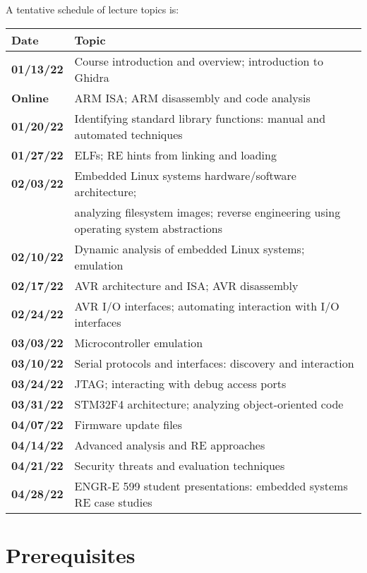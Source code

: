 \documentclass[12pt,twoside]{article}
\renewcommand\_{\textunderscore\allowbreak}
\begin{document}
A tentative schedule of lecture topics is:

\begin{center}
\renewcommand{\arraystretch}{1.5}
\begin{tabular}{|l|l|}
\hline
{\bf Date} & {\bf Topic}\\
\hline
{\bf 01/13/22} & Course introduction and overview; introduction to Ghidra\\
\hline
{\bf Online} & ARM ISA; ARM disassembly and code analysis\\
\hline
{\bf 01/20/22} & Identifying standard library functions: manual and automated techniques\\
\hline
{\bf 01/27/22} & ELFs; RE hints from linking and loading\\
\hline
{\bf 02/03/22} & Embedded Linux systems hardware/software architecture; \\
& analyzing filesystem images; reverse engineering using operating system abstractions\\
\hline
{\bf 02/10/22} & Dynamic analysis of embedded Linux systems; emulation\\
\hline
{\bf 02/17/22} & AVR architecture and ISA; AVR disassembly\\
\hline
{\bf 02/24/22} & AVR I/O interfaces; automating interaction with I/O interfaces\\
\hline
{\bf 03/03/22} & Microcontroller emulation\\
\hline
{\bf 03/10/22} & Serial protocols and interfaces: discovery and interaction\\
\hline
{\bf 03/24/22} & JTAG; interacting with debug access ports\\
\hline
{\bf 03/31/22} & STM32F4 architecture; analyzing object-oriented code\\
\hline
{\bf 04/07/22} & Firmware update files\\
\hline
{\bf 04/14/22} & Advanced analysis and RE approaches\\
\hline
{\bf 04/21/22} & Security threats and evaluation techniques\\
\hline
{\bf 04/28/22} & ENGR-E 599 student presentations: embedded systems RE case studies\\
\hline
\end{tabular}
\end{center}

\section{Prerequisites}
\end{document}
